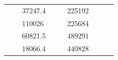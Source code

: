 \begin{table}[]
\begin{tabular}{|cclccllll}
\multicolumn{1}{|c|}{\cellcolor[HTML]{FFFFC7}}                                & \multicolumn{1}{c|}{\cellcolor[HTML]{DAE8FC}}                      & \multicolumn{1}{l|}{\cellcolor[HTML]{DAE8FC}37247.4}   & \multicolumn{1}{c|}{\cellcolor[HTML]{FFFFC7}}                                & \multicolumn{1}{c|}{\cellcolor[HTML]{DAE8FC}}                       & \multicolumn{1}{l|}{\cellcolor[HTML]{DDFDFF}225192}    &                                                                              &                                                                    &                                                        \\ \cline{3-3} \cline{6-6}
\multicolumn{1}{|c|}{\cellcolor[HTML]{FFFFC7}}                                & \multicolumn{1}{c|}{\cellcolor[HTML]{DAE8FC}}                      & \multicolumn{1}{l|}{\cellcolor[HTML]{DDFDFF}110026}    & \multicolumn{1}{c|}{\cellcolor[HTML]{FFFFC7}}                                & \multicolumn{1}{c|}{\cellcolor[HTML]{DAE8FC}}                       & \multicolumn{1}{l|}{\cellcolor[HTML]{DAE8FC}225684}    &                                                                              &                                                                    &                                                        \\ \cline{3-3} \cline{6-6}
\multicolumn{1}{|c|}{\cellcolor[HTML]{FFFFC7}}                                & \multicolumn{1}{c|}{\cellcolor[HTML]{DAE8FC}}                      & \multicolumn{1}{l|}{\cellcolor[HTML]{DAE8FC}60821.5}   & \multicolumn{1}{c|}{\cellcolor[HTML]{FFFFC7}}                                & \multicolumn{1}{c|}{\cellcolor[HTML]{DAE8FC}}                       & \multicolumn{1}{l|}{\cellcolor[HTML]{DDFDFF}489291}    &                                                                              &                                                                    &                                                        \\ \cline{3-3} \cline{6-6}
\multicolumn{1}{|c|}{\cellcolor[HTML]{FFFFC7}}                                & \multicolumn{1}{c|}{\cellcolor[HTML]{DAE8FC}}                      & \multicolumn{1}{l|}{\cellcolor[HTML]{DDFDFF}18066.4}   & \multicolumn{1}{c|}{\cellcolor[HTML]{FFFFC7}}                                & \multicolumn{1}{c|}{\cellcolor[HTML]{DAE8FC}}                       & \multicolumn{1}{l|}{\cellcolor[HTML]{DAE8FC}440828}    &                                                                              &                                                                    &                                                        \\ \cline{3-3} \cline{6-6}

\end{tabular}
\end{table}
